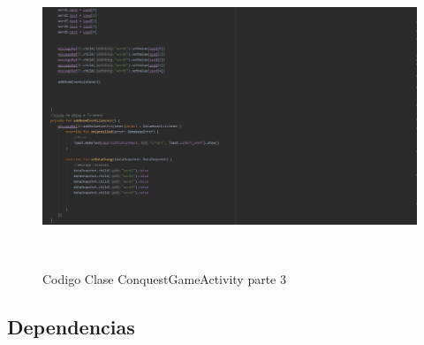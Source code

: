 \begin{figure}[H]
	\centering
	\includegraphics[width=16cm, height=9cm]{imgs/SourceCode3.jpg}
	\caption{Codigo Clase ConquestGameActivity parte 3}
\end{figure}
\subsection{Dependencias}
